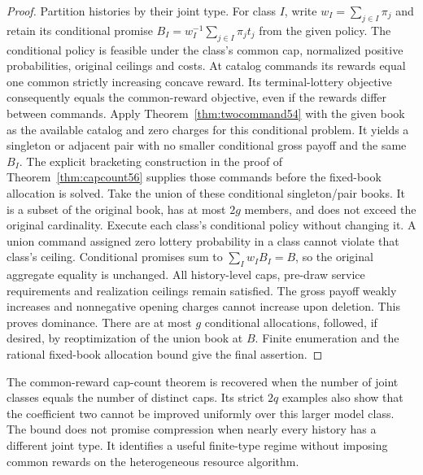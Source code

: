 \begin{proof}
Partition histories by their joint type. For class $I$, write $w_I=\sum_{j\in I}\pi_j$ and retain its conditional promise $B_I=w_I^{-1}\sum_{j\in I}\pi_j t_j$ from the given policy. The conditional policy is feasible under the class's common cap, normalized positive probabilities, original ceilings and costs. At catalog commands its rewards equal one common strictly increasing concave reward. Its terminal-lottery objective consequently equals the common-reward objective, even if the rewards differ between commands. Apply Theorem~\ref{thm:twocommand54} with the given book as the available catalog and zero charges for this conditional problem. It yields a singleton or adjacent pair with no smaller conditional gross payoff and the same $B_I$. The explicit bracketing construction in the proof of Theorem~\ref{thm:capcount56} supplies those commands before the fixed-book allocation is solved.
Take the union of these conditional singleton/pair books. It is a subset of the original book, has at most $2g$ members, and does not exceed the original cardinality. Execute each class's conditional policy without changing it. A union command assigned zero lottery probability in a class cannot violate that class's ceiling. Conditional promises sum to $\sum_I w_I B_I=B$, so the original aggregate equality is unchanged. All history-level caps, pre-draw service requirements and realization ceilings remain satisfied. The gross payoff weakly increases and nonnegative opening charges cannot increase upon deletion. This proves dominance. There are at most $g$ conditional allocations, followed, if desired, by reoptimization of the union book at $B$. Finite enumeration and the rational fixed-book allocation bound give the final assertion.
\end{proof}

The common-reward cap-count theorem is recovered when the number of joint classes equals the number of distinct caps. Its strict $2q$ examples also show that the coefficient two cannot be improved uniformly over this larger model class. The bound does not promise compression when nearly every history has a different joint type. It identifies a useful finite-type regime without imposing common rewards on the heterogeneous resource algorithm.
